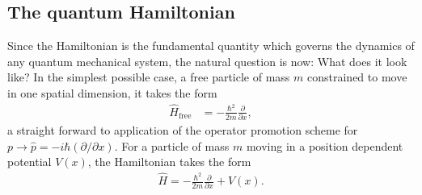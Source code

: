 \documentclass[a4paper]{article}
\newcommand{\pder}[2]{\frac{\partial   #1}{\partial   #2}}   %
\begin{document}


\subsection{The quantum Hamiltonian}
Since the Hamiltonian is the fundamental quantity which governs the dynamics of any quantum mechanical system, the natural question is now: What does it look like? In the simplest possible case, a free particle of mass $m$ constrained to move in one spatial dimension, it takes the form 
\begin{align}
\hat H_\text{free} &= -\frac{\hbar^2}{2m}\pder{}{x},
\end{align}
a straight forward to application of the operator promotion scheme for $p\rightarrow \hat p=-i\hbar(\partial /\partial x)$. For a particle of mass $m$ moving in a position dependent potential $V(x)$, the Hamiltonian takes the form 
\begin{align}
\hat H = -\frac{\hbar^2}{2m}\pder{}{x} + V(x).
\end{align}
\end{document}
